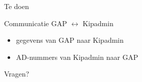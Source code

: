 \documentclass[chiro,pdf]{prosper}
\begin{document}
%
%

{
\begin{slide}{Te doen}
\begin{itemize}
{
\item Communicatie GAP $\leftrightarrow$ Kipadmin
\begin{itemize}
\item gegevens van GAP naar Kipadmin
\item AD-nummers van Kipadmin naar GAP
\end{itemize}
}
\end{itemize}
\end{slide}
}


%
%

\begin{slide}{Vragen?}
\end{slide}
\end{document}
